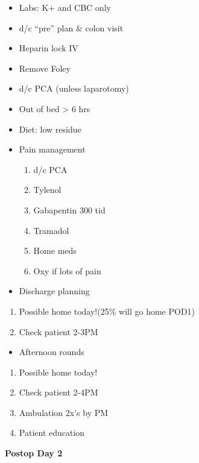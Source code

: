 \documentclass[
]{book}
\providecommand{\tightlist}{%
  \setlength{\itemsep}{0pt}\setlength{\parskip}{0pt}}
\begin{document}
\begin{itemize}
\tightlist
\item
  Labs: K+ and CBC only
\item
  d/c ``pre'' plan \& colon visit
\item
  Heparin lock IV
\item
  Remove Foley
\item
  d/c PCA (unless laparotomy)
\item
  Out of bed \textgreater{} 6 hrs
\item
  Diet: low residue
\item
  Pain management

  \begin{enumerate}
  \def\labelenumi{\arabic{enumi})}
  \tightlist
  \item
    d/c PCA
  \item
    Tylenol
  \item
    Gabapentin 300 tid
  \item
    Tramadol
  \item
    Home meds
  \item
    Oxy if lots of pain
  \end{enumerate}
\item
  Discharge planning
\end{itemize}

\begin{enumerate}
\def\labelenumi{\arabic{enumi})}
\tightlist
\item
  Possible home today!(25\% will go home POD1)
\item
  Check patient 2-3PM
\end{enumerate}

\begin{itemize}
\tightlist
\item
  Afternoon rounds
\end{itemize}

\begin{enumerate}
\def\labelenumi{\arabic{enumi})}
\tightlist
\item
  Possible home today!
\item
  Check patient 2-4PM
\item
  Ambulation 2x's by PM
\item
  Patient education
\end{enumerate}

\textbf{Postop Day 2}
\end{document}
